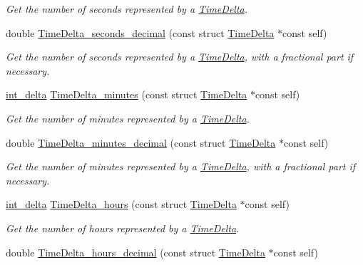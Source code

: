 \begin{DoxyCompactItemize}
\begin{DoxyCompactList}\small\item\em \-Get the number of seconds represented by a \hyperlink{structTimeDelta}{\-Time\-Delta}. \end{DoxyCompactList}\item 
double \hyperlink{time-delta_8h_ae4690765e21818a97d80b5e5f4334e73}{\-Time\-Delta\-\_\-seconds\-\_\-decimal} (const struct \hyperlink{structTimeDelta}{\-Time\-Delta} $\ast$const self)
\begin{DoxyCompactList}\small\item\em \-Get the number of seconds represented by a \hyperlink{structTimeDelta}{\-Time\-Delta}, with a fractional part if necessary. \end{DoxyCompactList}\item 
\hyperlink{types_8h_a8a67cf99971c5cfeeaa2380ba84a4c92}{int\-\_\-delta} \hyperlink{time-delta_8h_a561b203a50b7386cd1076e05f98eb488}{\-Time\-Delta\-\_\-minutes} (const struct \hyperlink{structTimeDelta}{\-Time\-Delta} $\ast$const self)
\begin{DoxyCompactList}\small\item\em \-Get the number of minutes represented by a \hyperlink{structTimeDelta}{\-Time\-Delta}. \end{DoxyCompactList}\item 
double \hyperlink{time-delta_8h_ae77d3ff682af80dff0e2d601143c4bd7}{\-Time\-Delta\-\_\-minutes\-\_\-decimal} (const struct \hyperlink{structTimeDelta}{\-Time\-Delta} $\ast$const self)
\begin{DoxyCompactList}\small\item\em \-Get the number of minutes represented by a \hyperlink{structTimeDelta}{\-Time\-Delta}, with a fractional part if necessary. \end{DoxyCompactList}\item 
\hyperlink{types_8h_a8a67cf99971c5cfeeaa2380ba84a4c92}{int\-\_\-delta} \hyperlink{time-delta_8h_aaf78ae5ac19ba90ef26ff6cfc89ea734}{\-Time\-Delta\-\_\-hours} (const struct \hyperlink{structTimeDelta}{\-Time\-Delta} $\ast$const self)
\begin{DoxyCompactList}\small\item\em \-Get the number of hours represented by a \hyperlink{structTimeDelta}{\-Time\-Delta}. \end{DoxyCompactList}\item 
double \hyperlink{time-delta_8h_ab3eac32bcfa848e984b2d3d2fb48f2f3}{\-Time\-Delta\-\_\-hours\-\_\-decimal} (const struct \hyperlink{structTimeDelta}{\-Time\-Delta} $\ast$const self)

\end{DoxyCompactItemize}
